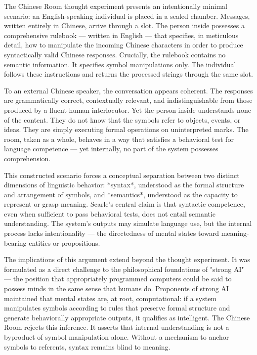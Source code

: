 The Chinese Room thought experiment presents an intentionally minimal scenario: an English-speaking individual is placed in a sealed chamber. Messages, written entirely in Chinese, arrive through a slot. The person inside possesses a comprehensive rulebook — written in English — that specifies, in meticulous detail, how to manipulate the incoming Chinese characters in order to produce syntactically valid Chinese responses. Crucially, the rulebook contains no semantic information. It specifies symbol manipulations only. The individual follows these instructions and returns the processed strings through the same slot.

To an external Chinese speaker, the conversation appears coherent. The responses are grammatically correct, contextually relevant, and indistinguishable from those produced by a fluent human interlocutor. Yet the person inside understands none of the content. They do not know that the symbols refer to objects, events, or ideas. They are simply executing formal operations on uninterpreted marks. The room, taken as a whole, behaves in a way that satisfies a behavioral test for language competence — yet internally, no part of the system possesses comprehension.

This constructed scenario forces a conceptual separation between two distinct dimensions of linguistic behavior: *syntax*, understood as the formal structure and arrangement of symbols, and *semantics*, understood as the capacity to represent or grasp meaning. Searle's central claim is that syntactic competence, even when sufficient to pass behavioral tests, does not entail semantic understanding. The system's outputs may simulate language use, but the internal process lacks intentionality — the directedness of mental states toward meaning-bearing entities or propositions.

The implications of this argument extend beyond the thought experiment. It was formulated as a direct challenge to the philosophical foundations of "strong AI" — the position that appropriately programmed computers could be said to possess minds in the same sense that humans do. Proponents of strong AI maintained that mental states are, at root, computational: if a system manipulates symbols according to rules that preserve formal structure and generate behaviorally appropriate outputs, it qualifies as intelligent. The Chinese Room rejects this inference. It asserts that internal understanding is not a byproduct of symbol manipulation alone. Without a mechanism to anchor symbols to referents, syntax remains blind to meaning.

